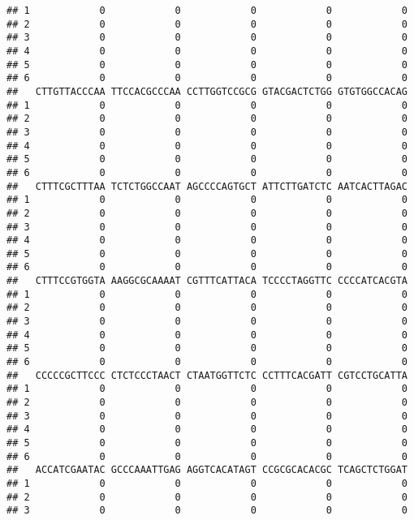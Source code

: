 \documentclass[]{article}
\begin{document}
\begin{verbatim}
## 1            0            0            0            0            0
## 2            0            0            0            0            0
## 3            0            0            0            0            0
## 4            0            0            0            0            0
## 5            0            0            0            0            0
## 6            0            0            0            0            0
##   CTTGTTACCCAA TTCCACGCCCAA CCTTGGTCCGCG GTACGACTCTGG GTGTGGCCACAG
## 1            0            0            0            0            0
## 2            0            0            0            0            0
## 3            0            0            0            0            0
## 4            0            0            0            0            0
## 5            0            0            0            0            0
## 6            0            0            0            0            0
##   CTTTCGCTTTAA TCTCTGGCCAAT AGCCCCAGTGCT ATTCTTGATCTC AATCACTTAGAC
## 1            0            0            0            0            0
## 2            0            0            0            0            0
## 3            0            0            0            0            0
## 4            0            0            0            0            0
## 5            0            0            0            0            0
## 6            0            0            0            0            0
##   CTTTCCGTGGTA AAGGCGCAAAAT CGTTTCATTACA TCCCCTAGGTTC CCCCATCACGTA
## 1            0            0            0            0            0
## 2            0            0            0            0            0
## 3            0            0            0            0            0
## 4            0            0            0            0            0
## 5            0            0            0            0            0
## 6            0            0            0            0            0
##   CCCCCGCTTCCC CTCTCCCTAACT CTAATGGTTCTC CCTTTCACGATT CGTCCTGCATTA
## 1            0            0            0            0            0
## 2            0            0            0            0            0
## 3            0            0            0            0            0
## 4            0            0            0            0            0
## 5            0            0            0            0            0
## 6            0            0            0            0            0
##   ACCATCGAATAC GCCCAAATTGAG AGGTCACATAGT CCGCGCACACGC TCAGCTCTGGAT
## 1            0            0            0            0            0
## 2            0            0            0            0            0
## 3            0            0            0            0            0

\end{verbatim}
\end{document}
